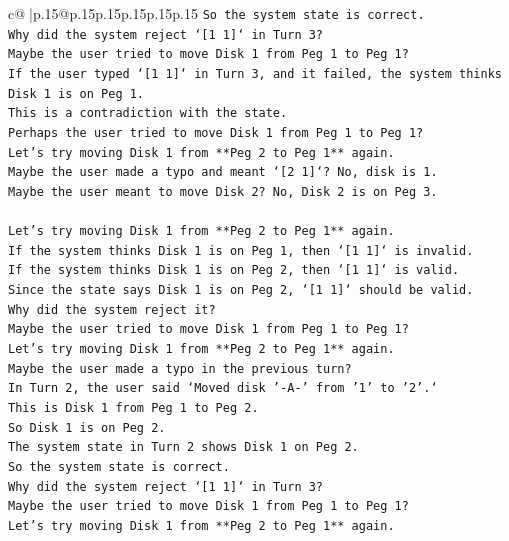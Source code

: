 \documentclass{article}
\begin{document}
{\begin{supertabular}{c@{$\;$}|p{.15\linewidth}@{}p{.15\linewidth}p{.15\linewidth}p{.15\linewidth}p{.15\linewidth}p{.15\linewidth}}
{{{\texttt{So the system state is correct.} \\
\texttt{Why did the system reject `{[}1 1{]}` in Turn 3?} \\
\texttt{Maybe the user tried to move Disk 1 from Peg 1 to Peg 1?} \\
\texttt{If the user typed `{[}1 1{]}` in Turn 3, and it failed, the system thinks Disk 1 is on Peg 1.} \\
\texttt{This is a contradiction with the state.} \\
\texttt{Perhaps the user tried to move Disk 1 from Peg 1 to Peg 1?} \\
\texttt{Let's try moving Disk 1 from **Peg 2 to Peg 1** again.} \\
\texttt{Maybe the user made a typo and meant `{[}2 1{]}`? No, disk is 1.} \\
\texttt{Maybe the user meant to move Disk 2? No, Disk 2 is on Peg 3.} \\
\\ 
\texttt{Let's try moving Disk 1 from **Peg 2 to Peg 1** again.} \\
\texttt{If the system thinks Disk 1 is on Peg 1, then `{[}1 1{]}` is invalid.} \\
\texttt{If the system thinks Disk 1 is on Peg 2, then `{[}1 1{]}` is valid.} \\
\texttt{Since the state says Disk 1 is on Peg 2, `{[}1 1{]}` should be valid.} \\
\texttt{Why did the system reject it?} \\
\texttt{Maybe the user tried to move Disk 1 from Peg 1 to Peg 1?} \\
\texttt{Let's try moving Disk 1 from **Peg 2 to Peg 1** again.} \\
\texttt{Maybe the user made a typo in the previous turn?} \\
\texttt{In Turn 2, the user said `Moved disk '{-}A{-}' from '1' to '2'.`} \\
\texttt{This is Disk 1 from Peg 1 to Peg 2.} \\
\texttt{So Disk 1 is on Peg 2.} \\
\texttt{The system state in Turn 2 shows Disk 1 on Peg 2.} \\
\texttt{So the system state is correct.} \\
\texttt{Why did the system reject `{[}1 1{]}` in Turn 3?} \\
\texttt{Maybe the user tried to move Disk 1 from Peg 1 to Peg 1?} \\
\texttt{Let's try moving Disk 1 from **Peg 2 to Peg 1** again.} \\
}}}
\end{supertabular}}
\end{document}
